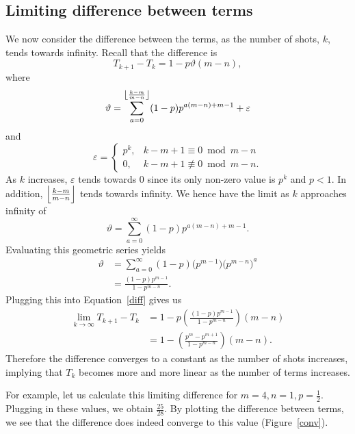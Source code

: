 \subsection{Limiting difference between terms}
We now consider the difference between the terms, as the number of shots, $k$, tends towards infinity. Recall that the difference is 
\begin{equation}\label{diff}
  T_{k+1} - T_{k} = 1 - p\vartheta(m-n),
  \end{equation}
  where \[
\vartheta = \sum_{a=0}^{\floor*{\frac{k-m}{m-n}}} (1-p)p^{a(m-n)+m-1} + \varepsilon
\] and \[
  \varepsilon = 
  \begin{cases}
    p^{k}, &k-m+1 \equiv 0 \bmod m-n \\
    0, &k-m+1 \not\equiv 0 \bmod m-n.
  \end{cases}
\] As $k$ increases, $\varepsilon$ tends towards 0 since its only non-zero value is $p^{k}$ and $p < 1$. In addition, $\floor*{\frac{k-m}{m-n}}$ tends towards infinity. We hence have the limit as $k$ approaches infinity of \[
  \vartheta = \sum_{a=0}^{\infty} (1-p)p^{a(m-n)+m-1}
.\] Evaluating this geometric series yields
\begin{align*}
  \vartheta &= \sum_{a=0}^{\infty} (1-p)\bigl(p^{m-1}\bigr)\bigl(p^{m-n}\bigr)^{a} \\
            &= \frac{(1-p)p^{m-1}}{1-p^{m-n}}.
\end{align*}
Plugging this into Equation~\ref{diff} gives us
\begin{align}
  \lim_{k \to \infty} T_{k+1} - T_{k} &= 1 - p\left( \frac{(1-p)p^{m-1}}{1-p^{m-n}} \right) (m-n) \nonumber \\
                                      &= 1 - \left( \frac{p^{m} - p^{m+1}}{1-p^{m-n}} \right) (m-n). \label{eq:4}
\end{align}
Therefore the difference converges to a constant as the number of shots increases, implying that $T_k$ becomes more and more linear as the number of terms increases.

For example, let us calculate this limiting difference for $m = 4, n = 1, p = \frac{1}{2}$. Plugging in these values, we obtain $\frac{25}{28}$. By plotting the difference between terms, we see that the difference does indeed converge to this value (Figure~\ref{conv}).

